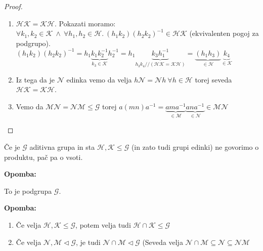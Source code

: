 \documentclass[a4paper]{article}
\newcounter{environment:definition_counter}
\newcounter{environment:theorem_counter}
\newcounter{environment:statement_counter}
\newenvironment{remark}
{\textbf{Opomba:}}
{}
\begin{document}
\begin{proof}\leavevmode
\begin{enumerate}
\item $\mathcal{H}\mathcal{K}=\mathcal{K}\mathcal{H}$. Pokazati moramo: $\forall k_1, k_2 \in \mathcal{K} \ \land \ \forall h_1,h_2 \in \mathcal{H}. \ (h_1k_2)(h_2k_2)^{-1} \in \mathcal{H}\mathcal{K}$ (ekvivalenten pogoj za podgrupo).\\
$(h_1k_2)(h_2k_2)^{-1} = h_1 \underbrace{k_1 k_2^{-1}}_{k_3 \in \mathcal{K}} h_2^{-1} = h_1 \underbrace{k_3 h_1^{-1}}_{h_3k_4 // (\mathcal{H}\mathcal{K} = \mathcal{K}\mathcal{H})} = \underbrace{(h_1 h_3)}_{\in \mathcal{H}}\underbrace{k_4}_{\in \mathcal{K}} $
\item Iz tega da je $\mathcal{N}$ edinka vemo da velja $h\mathcal{N} = \mathcal{N}h \ \forall h \in \mathcal{H}$ torej seveda $\mathcal{H}\mathcal{K}=\mathcal{K}\mathcal{H}$.
\item Vemo da $\mathcal{M}\mathcal{N}=\mathcal{N}\mathcal{M} \leq \mathcal{G}$ torej $a(mn)a^{-1} =  \underbrace{ama^{-1}}_{\in \mathcal{M}} \underbrace{ana^{-1}}_{\in \mathcal{N}} \in \mathcal{M}\mathcal{N}$ 
\end{enumerate}
\end{proof}

Če je $\mathcal{G}$ aditivna grupa in sta $\mathcal{H}, \mathcal{K} \leq \mathcal{G}$ (in zato tudi grupi edinki) ne govorimo o produktu, pač pa o vsoti.


\begin{remark}

To je podgrupa $\mathcal{G}$.

\end{remark}

\begin{remark}

\begin{enumerate}

\item Če velja $\mathcal{H}, \mathcal{K} \leq \mathcal{G}$, potem velja tudi $\mathcal{H} \cap \mathcal{K} \leq \mathcal{G}$

\item Če velja $\mathcal{N}, \mathcal{M} \triangleleft \mathcal{G}$, je tudi $\mathcal{N} \cap \mathcal{M} \triangleleft \mathcal{G}$ (Seveda velja $\mathcal{N} \cap \mathcal{M} \subseteq \mathcal{N} \subseteq \mathcal{N} \mathcal{M}$

\end{enumerate}

\end{remark}
\end{document}
